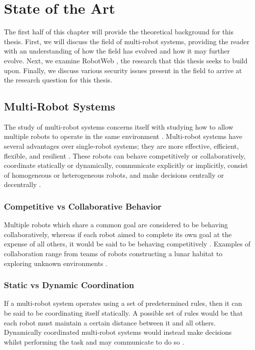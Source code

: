 \chapter{State of the Art}

The first half of this chapter will provide the theoretical background for this thesis. First, we will discuss the field of multi-robot systems, providing the reader with an understanding of how the field has evolved and how it may further evolve. Next, we examine RobotWeb \cite{Robotweb}, the research that this thesis seeks to build upon. Finally, we discuss various security issues present in the field to arrive at the research question for this thesis.

\section{Multi-Robot Systems}
The study of multi-robot systems concerns itself with studying how to allow multiple robots to operate in the same environment \cite{MRS-Implicit-Explicit-Comms}. Multi-robot systems have several advantages over single-robot systems; they are more effective, efficient, flexible, and resilient \cite{MultiVsSingleRobotSystems}. These robots can behave competitively or collaboratively, coordinate statically or dynamically, communicate explicitly or implicitly, consist of homogeneous or heterogeneous robots, and make decisions centrally or decentrally \cite{MultiRobotCoordinationSurvey}. 

\subsection{Competitive vs Collaborative Behavior}
Multiple robots which share a common goal are considered to be behaving collaboratively, whereas if each robot aimed to complete its own goal at the expense of all others, it would be said to be behaving competitively \cite{MultiRobotCoordinationSurvey}. Examples of collaboration range from teams of robots constructing a lunar habitat \cite{LunarHabitatConstructionExample} to exploring unknown environments \cite{MultiRobotExplorationExample}.

\subsection{Static vs Dynamic Coordination}
If a multi-robot system operates using a set of predetermined rules, then it can be said to be coordinating itself statically. A possible set of rules would be that each robot must maintain a certain distance between it and all others. Dynamically coordinated multi-robot systems would instead make decisions whilst performing the task and may communicate to do so \cite{MultiRobotCoordinationSurvey}.


